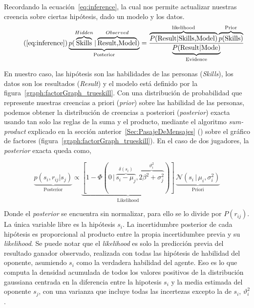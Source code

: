 \documentclass[11pt,twoside,spanish]{report} %
\begin{document}
Recordando la ecuaci\'on~\ref{eq:inference}, la cual nos permite actualizar nuestras creencia sobre ciertas hip\'otesis, dado un modelo y los datos.
\begin{equation}\tag{\ref{eq:inference}}
\underbrace{p(\overbrace{\text{Skills}}^{Hidden}|\overbrace{\text{Result,Model}}^{Observed})}_{\text{Posterior}} = \frac{\overbrace{P(\text{Result}|\text{Skills,Model})}^{\text{likelihood}}\overbrace{p(\text{Skills})}^{\text{Prior}}}{\underbrace{P(\text{Result}|\text{Mode})}_{\text{Evidence}}}
\end{equation}

En nuestro caso, las hip\'otesis son las habilidades de las personas (\textit{Skills}), los datos son los resultados (\textit{Result}) y el modelo est\'a definido por la figura~\ref{graph:factorGraph_trueskill}.
Con una distribuci\'on de probabilidad que represente nuestras creencias a priori (\textit{prior}) sobre las habilidad de las personas, podemos obtener la distribuci\'on de creencias a posteriori (\textit{posterior}) exacta usando tan solo las reglas de la suma y el producto, mediante el algoritmo \textit{sum-product} explicado en la secci\'on anterior~\ref{Sec:PasajeDeMensajes} ()  sobre el gr\'afico de factores (figura~\ref{graph:factorGraph_trueskill}).
En el caso de dos jugadores, la \textit{posterior} exacta queda como,

\begin{equation}\label{eq:bayesaprox}
\underbrace{p(s_i, r_{ij}| s_j)}_{\text{Posterior}} \propto
 \underbrace{[1 - \Phi(0 \, | \, \overbrace{s_i - \mu_j}^{\delta(s_i)},  \overbrace{ 2\beta^2 + \sigma_j^2}^{\vartheta_i^2})]}_{\text{Likelihood}} \,  \underbrace{\mathcal{N}(s_i \, | \, \mu_i, \sigma_i^2 )}_{\text{Priori}}
\end{equation}



Donde el \textit{posterior} se encuentra sin normalizar, para ello se lo divide por $P(r_{ij})$.
La \'unica variable libre es la hip\'otesis $s_i$.
La incertidumbre posterior de cada hip\'otesis es proporcional al producto entre la propia incertidumbre previa y su \textit{likelihood}.
Se puede notar que el \textit{likelihood} es solo la predicci\'on previa del resultado ganador observado, realizada con todas las hip\'otesis de habilidad del oponente, asumiendo $s_i$ como la verdadera habilidad del agente.
Eso es lo que computa la densidad acumulada de todos los valores positivos de la distribuci\'on gaussiana centrada en la diferencia entre la hipotesis $s_i$ y la media estimada del oponente $s_j$, con una varianza que incluye todas las incertezas excepto la de $s_i$, $\vartheta_i^2$.
\end{document}
